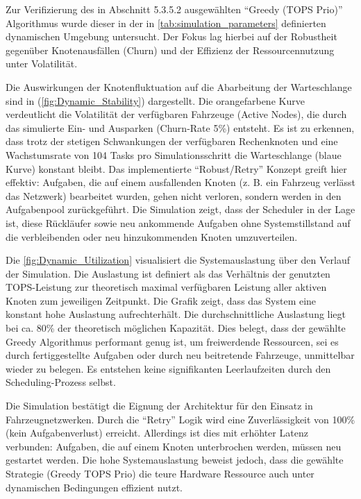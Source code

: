 Zur Verifizierung des in Abschnitt 5.3.5.2 ausgewählten \enquote{Greedy (TOPS Prio)} Algorithmus wurde dieser in der in \autoref{tab:simulation_parameters} definierten dynamischen Umgebung untersucht. Der Fokus lag hierbei auf der Robustheit gegenüber Knotenausfällen (Churn) und der Effizienz der Ressourcennutzung unter Volatilität.

Die Auswirkungen der Knotenfluktuation auf die Abarbeitung der Warteschlange sind in (\autoref{fig:Dynamic_Stability}) dargestellt.  Die orangefarbene Kurve verdeutlicht die Volatilität der verfügbaren Fahrzeuge (Active Nodes), die durch das simulierte Ein- und Ausparken (Churn-Rate 5\%) entsteht. Es ist zu erkennen, dass trotz der stetigen Schwankungen der verfügbaren Rechenknoten und eine Wachstumsrate von 104 Tasks pro Simulationsschritt die Warteschlange (blaue Kurve) konstant bleibt. Das implementierte \enquote{Robust/Retry} Konzept greift hier effektiv: Aufgaben, die auf einem ausfallenden Knoten (z. B. ein Fahrzeug verlässt das Netzwerk) bearbeitet wurden, gehen nicht verloren, sondern werden in den Aufgabenpool zurückgeführt. Die Simulation zeigt, dass der Scheduler in der Lage ist, diese Rückläufer sowie neu ankommende Aufgaben ohne Systemstillstand auf die verbleibenden oder neu hinzukommenden Knoten umzuverteilen.

Die \autoref{fig:Dynamic_Utilization} visualisiert die Systemauslastung über den Verlauf der Simulation. Die Auslastung ist definiert als das Verhältnis der genutzten TOPS-Leistung zur theoretisch maximal verfügbaren Leistung aller aktiven Knoten zum jeweiligen Zeitpunkt. Die Grafik zeigt, dass das System eine konstant hohe Auslastung aufrechterhält. Die durchschnittliche Auslastung liegt bei ca. 80\% der theoretisch möglichen Kapazität. Dies belegt, dass der gewählte Greedy Algorithmus performant genug ist, um freiwerdende Ressourcen, sei es durch fertiggestellte Aufgaben oder durch neu beitretende Fahrzeuge, unmittelbar wieder zu belegen. Es entstehen keine signifikanten Leerlaufzeiten durch den Scheduling-Prozess selbst.

Die Simulation bestätigt die Eignung der Architektur für den Einsatz in Fahrzeugnetzwerken. Durch die \enquote{Retry} Logik wird eine Zuverlässigkeit von 100\% (kein Aufgabenverlust) erreicht. Allerdings ist dies mit erhöhter Latenz verbunden: Aufgaben, die auf einem Knoten unterbrochen werden, müssen neu gestartet werden. Die hohe Systemauslastung beweist jedoch, dass die gewählte Strategie (Greedy TOPS Prio) die teure Hardware Ressource auch unter dynamischen Bedingungen effizient nutzt.

